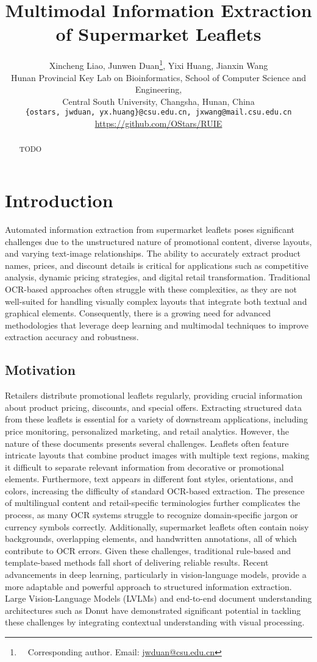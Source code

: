 \documentclass[11pt]{article}
\title{Multimodal Information Extraction of Supermarket Leaflets}
\author{Xincheng Liao\textsuperscript{}, Junwen Duan\textsuperscript{}\thanks{\ \ Corresponding author. Email: \href{mailto:jwduan@csu.edu.cn}{jwduan@csu.edu.cn}}, Yixi Huang\textsuperscript{}, Jianxin Wang\textsuperscript{} \\
Hunan Provincial Key Lab on Bioinformatics, School of Computer Science and Engineering, \\
Central South University, Changsha, Hunan, China \\
\texttt{\{ostars, jwduan, yx.huang\}@csu.edu.cn, jxwang@mail.csu.edu.cn} \\
\href{https://github.com/OStars/RUIE}{https://github.com/OStars/RUIE}
}
\begin{document}
\maketitle
\begin{abstract}
TODO
\end{abstract}

\section{Introduction}

Automated information extraction from supermarket leaflets poses significant challenges due to the unstructured nature of promotional content, diverse layouts, and varying text-image relationships. The ability to accurately extract product names, prices, and discount details is critical for applications such as competitive analysis, dynamic pricing strategies, and digital retail transformation. Traditional OCR-based approaches often struggle with these complexities, as they are not well-suited for handling visually complex layouts that integrate both textual and graphical elements. Consequently, there is a growing need for advanced methodologies that leverage deep learning and multimodal techniques to improve extraction accuracy and robustness.

\subsection{Motivation}

Retailers distribute promotional leaflets regularly, providing crucial information about product pricing, discounts, and special offers. Extracting structured data from these leaflets is essential for a variety of downstream applications, including price monitoring, personalized marketing, and retail analytics. However, the nature of these documents presents several challenges. Leaflets often feature intricate layouts that combine product images with multiple text regions, making it difficult to separate relevant information from decorative or promotional elements. Furthermore, text appears in different font styles, orientations, and colors, increasing the difficulty of standard OCR-based extraction. The presence of multilingual content and retail-specific terminologies further complicates the process, as many OCR systems struggle to recognize domain-specific jargon or currency symbols correctly. Additionally, supermarket leaflets often contain noisy backgrounds, overlapping elements, and handwritten annotations, all of which contribute to OCR errors. Given these challenges, traditional rule-based and template-based methods fall short of delivering reliable results. Recent advancements in deep learning, particularly in vision-language models, provide a more adaptable and powerful approach to structured information extraction. Large Vision-Language Models (LVLMs) and end-to-end document understanding architectures such as Donut have demonstrated significant potential in tackling these challenges by integrating contextual understanding with visual processing.
\end{document}
